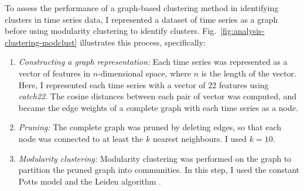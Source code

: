To assess the performance of a graph-based clustering method in identifying clusters in time series data, I represented a dataset of time series as a graph before using modularity clustering to identify clusters.
Fig.\ \ref{fig:analysis-clustering-modclust} illustrates this process, specifically:
\begin{enumerate}
  \item \emph{Constructing a graph representation:}
        Each time series was represented as a vector of features in $n$-dimensional space, where $n$ is the length of the vector.
        Here, I represented each time series with a vector of 22 features using \textit{catch22}.
        The cosine distances between each pair of vector was computed, and became the edge weights of a complete graph with each time series as a node.
  \item \emph{Pruning:}
        The complete graph was pruned by deleting edges, so that each node was connected to at least the $k$ nearest neighbours.
        I used $k=10$.
  \item \emph{Modularity clustering:}
        Modularity clustering was performed on the graph to partition the pruned graph into communities.
        In this step, I used the constant Potts model \parencite{traagNarrowScopeResolutionlimitfree2011} and the Leiden algorithm \parencite{traagLouvainLeidenGuaranteeing2019}.
\end{enumerate}

